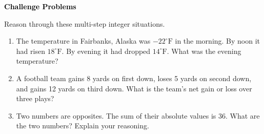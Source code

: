 \documentclass[12pt, letterpaper, fleql]{article}
\begin{document}
\newpage

\begin{tcolorbox}[colback=black!10]
\large\textcolor{black}{\textbf{Challenge Problems}}
\end{tcolorbox}

\noindent
Reason through these multi-step integer situations.

\vspace{3mm}
\begin{enumerate}[itemsep=2.4cm, leftmargin=0.6cm]
\item The temperature in Fairbanks, Alaska was $-22^\circ\text{F}$ in the morning. By noon it had risen $18^\circ\text{F}$. By evening it had dropped $14^\circ\text{F}$. What was the evening temperature?

\vspace{2.3cm}

\item A football team gains 8 yards on first down, loses 5 yards on second down, and gains 12 yards on third down. What is the team's net gain or loss over three plays?

\vspace{2.3cm}

\item Two numbers are opposites. The sum of their absolute values is 36. What are the two numbers? Explain your reasoning.

\vspace{2.5cm}

\end{enumerate}
\end{document}
